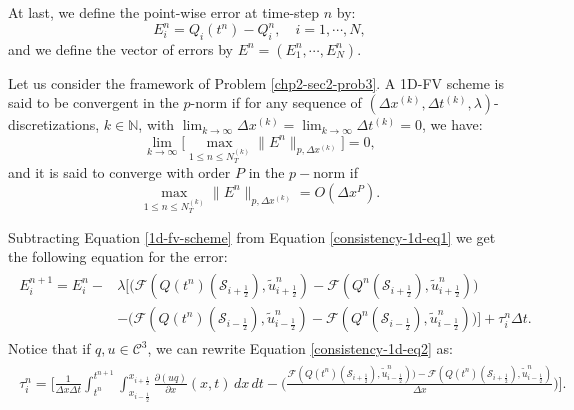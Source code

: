 At last, we define the point-wise error at time-step $n$ by:
\begin{equation*}
	E_i^n = Q_i(t^n) - Q_i^n, \quad i=1, \cdots, N,
\end{equation*}
and we define the vector of errors by $E^n = (E_1^n, \cdots, E_N^n)$. 
\begin{definition}[Convergence]
	\label{chp2-def-conv}
	Let us consider the framework of Problem \ref{chp2-sec2-prob3}.
	A 1D-FV scheme is said to be convergent in the $p$-norm if for any sequence of $(\Delta x^{(k)}, \Delta t^{(k)},\lambda)$-discretizations, 
	$k \in \mathbb{N}$, with $\lim_{k\to \infty }{\Delta x^{(k)}} = \lim_{k\to \infty }{\Delta t^{(k)}} = 0$, we have:
	\begin{equation*}
		\lim_{k\to \infty}\bigg[ {\max_{1\leq n\leq N_T^{(k)}}}{\|E^n\|_{p,\Delta x^{(k)}}} \bigg] = 0,
	\end{equation*}
	and it is said to converge with order $P$ in the $p-$norm if
	\begin{equation*}
		{\max_{1\leq n\leq N_T^{(k)}}}{\|E^n\|_{p,\Delta x^{(k)}}} = O(\Delta x^P).
	\end{equation*}
\end{definition}
Subtracting Equation \eqref{1d-fv-scheme} from Equation \eqref{consistency-1d-eq1} we get
the following equation for the error:
\begin{align}
	\begin{split}
	\label{erroreq-1d-eq2}
		E^{n+1}_i = E^n_i -
		&\lambda
		\bigg[
			\bigg( \mathcal{F}(Q(t^n)(\mathcal{S}_{i+\frac{1}{2}} ),\tilde{u}^n_{i+\frac{1}{2}}) - \mathcal{F}(Q^n(\mathcal{S}_{i+\frac{1}{2}} ),\tilde{u}^n_{i+\frac{1}{2}}) \bigg) \\
		   &-\bigg( \mathcal{F}(Q(t^n)(\mathcal{S}_{i-\frac{1}{2}} ),\tilde{u}^n_{i-\frac{1}{2}}) - \mathcal{F}(Q^n(\mathcal{S}_{i-\frac{1}{2}} ),\tilde{u}^n_{i-\frac{1}{2}}) \bigg)
		\bigg] 
		+ \tau_{i}^n \Delta t .
	\end{split}
\end{align}
Notice that if $q,u \in \mathcal{C}^3$, we can rewrite Equation \ref{consistency-1d-eq2} as:
\begin{align*}
	\begin{split}
		\tau_{i}^n = 
		\bigg[ \frac{1}{\Delta x \Delta t}  \int_{t^{n}}^{t^{n+1}} \int_{x_{i-\frac{1}{2}}}^{x_{i+\frac{1}{2}}}
		{\frac{\partial (uq)}{\partial x}}(x, t) \,dx \,dt - 
		\bigg(\frac{\mathcal{F}(Q(t^n)(\mathcal{S}_{i+\frac{1}{2}} ),\tilde{u}^n_{i-\frac{1}{2}})) -\mathcal{F}(Q(t^n)(\mathcal{S}_{i+\frac{1}{2}} ),\tilde{u}^n_{i-\frac{1}{2}})}{\Delta x} \bigg)
		\bigg].
	\end{split}
\end{align*}
